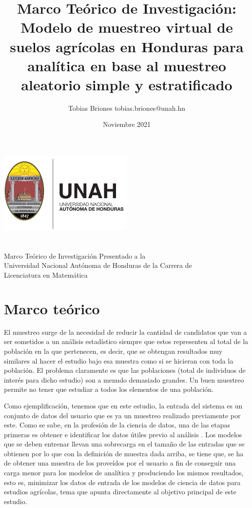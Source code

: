 \documentclass{report}
\title{Marco Teórico de Investigación: Modelo de muestreo virtual de suelos agrícolas en Honduras para analítica en base al muestreo aleatorio simple y estratificado}
\author{Tobias Briones \bigbreak tobias.briones@unah.hn}
\date{Noviembre 2021}
\begin{document}
\makeatletter
    \begin{titlepage}
        \begin{center}
            \includegraphics[width=0.3\linewidth]{ref/logo-unah.png}\\[4ex]
            {\huge \bfseries \@title 
            \vspace{1cm}}\\[2ex]
            {\LARGE \@author}\\[50ex] 
            
            {\large
            Marco Teórico de Investigación Presentado a la\\
            Universidad Nacional Autónoma de Honduras de la Carrera de\\
            Licenciatura en Matemática
            }\\[2ex]
            
            {\large \@date}
        \end{center}
    \end{titlepage}
\makeatother
\thispagestyle{empty}
\newpage

\thispagestyle{empty}
\tableofcontents
\listoffigures
\newpage

\chapter{Marco teórico}

El muestreo surge de la necesidad de reducir la cantidad de candidatos que van a ser sometidos a un análisis estadístico siempre que estos representen al total de la población en la que pertenecen, es decir, que se obtengan resultados muy similares al hacer el estudio bajo esa muestra como si se hicieran con toda la población. El problema claramente es que las poblaciones (total de individuos de interés para dicho estudio) son a menudo demasiado grandes. Un buen muestreo permite no tener que estudiar a todos los elementos de una población. 

\bigbreak

Como ejemplificación, tenemos que en este estudio, la entrada del sistema es un conjunto de datos del usuario que es ya un muestreo realizado previamente por este. Como se sabe, en la profesión de la ciencia de datos, una de las etapas primeras es obtener e identificar los datos útiles previo al análisis \cite{university-of-wisconsin-data-science-2021}. Los modelos que se deben entrenar llevan una sobrecarga en el tamaño de las entradas que se obtienen por lo que con la definición de muestra dada arriba, se tiene que, se ha de obtener una muestra de los  proveídos por el usuario a fin de conseguir una carga menor para los modelos de analítica y produciendo los mismos resultados, esto es, minimizar los datos de entrada de los modelos de ciencia de datos para estudios agrícolas, tema que apunta directamente al objetivo principal de este estudio.
\end{document}
